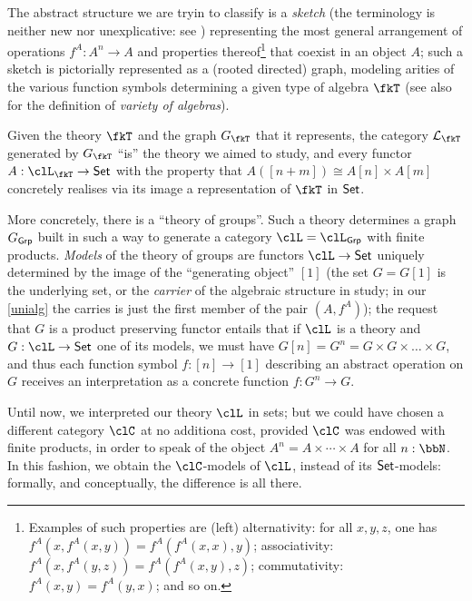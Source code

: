 The abstract structure we are tryin to classify is a \emph{sketch} (the terminology is neither new nor unexplicative: see \cite{ehresmann,lair, Bor2}) representing the most general arrangement of operations $f^A : A^n \to A$ and properties thereof\footnote{Examples of such properties are (left) alternativity: for all $x,y,z$, one has $f^A(x,f^A(x,y)) = f^A(f^A(x,x),y)$; associativity: $f^A(x,f^A(y,z)) = f^A(f^A(x,y),z)$; commutativity: $f^A(x,y)=f^A(y,x)$; and so on.} that coexist in an object $A$; such a sketch is pictorially represented as a (rooted directed) graph, modeling arities of the various function symbols determining a given type of algebra $\fkT$ (see also \cite{grillet} for the definition of \emph{variety of algebras}).%

Given the theory $\fkT$ and the graph $G_{\fkT}$ that it represents, the category $\mathcal{L}_{\fkT}$ generated by $G_\fkT$ ``is'' the theory we aimed to study, and every functor $A: \clL_{\fkT} \to \Set$ with the property that $A([n+m]) \cong A[n] \times A[m]$ concretely realises via its image a representation of $\fkT$ in $\mathsf{Set}$.

More concretely, there is a ``theory of groups''. Such a theory determines a graph $G_{\mathsf{Grp}}$ built in such a way to generate a category $\clL=\clL_{\cate{Grp}}$ with finite products. \emph{Models} of the theory of groups are functors $\clL \to \Set$ uniquely determined by the image of the ``generating object'' $[1]$ (the set $G=G[1]$ is the underlying set, or the \emph{carrier} of the algebraic structure in study; in our \autoref{unialg} the carries is just the first member of the pair $(A,f^A)$); the request that $G$ is a product preserving functor entails that if $\clL$ is a theory and $G : \clL \to \Set$ one of its models, we must have $G[n]=G^n = G \times G \times\dots\times G$, and thus each function symbol $f : [n]\to [1]$ describing an abstract operation on $G$ receives an interpretation as a concrete function $f : G^n \to G$.

Until now, we interpreted our theory $\clL$ in sets; but we could have chosen a different category $\clC$ at no additiona cost, provided $\clC$ was endowed with finite products, in order to speak of the object $A^n = A\times \cdots\times A$ for all $n : \bbN$. In this fashion, we obtain the $\clC$-models of $\clL$, instead of its $\mathsf{Set}$-models: formally, and conceptually, the difference is all there.

